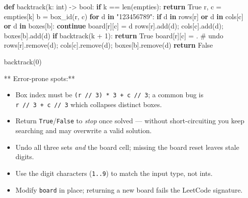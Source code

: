 \documentclass[11pt]{article}
\providecommand{\tightlist}{\setlength{\itemsep}{1pt}\setlength{\parskip}{0pt}}
\newenvironment{Shaded}{\begin{snugshade}}{\end{snugshade}}
\newcommand{\BuiltInTok}[1]{\textcolor[rgb]{0.50,0.55,0.55}{#1}}
\newcommand{\CommentTok}[1]{\textcolor[rgb]{0.48,0.49,0.49}{#1}}
\newcommand{\ControlFlowTok}[1]{\textcolor[rgb]{0.99,0.74,0.29}{\textbf{#1}}}
\newcommand{\DecValTok}[1]{\textcolor[rgb]{0.96,0.45,0.00}{#1}}
\newcommand{\KeywordTok}[1]{\textcolor[rgb]{0.81,0.81,0.76}{\textbf{#1}}}
\newcommand{\NormalTok}[1]{\textcolor[rgb]{0.81,0.81,0.76}{#1}}
\newcommand{\OperatorTok}[1]{\textcolor[rgb]{0.81,0.81,0.76}{#1}}
\newcommand{\StringTok}[1]{\textcolor[rgb]{0.96,0.31,0.31}{#1}}
\newcommand{\VariableTok}[1]{\textcolor[rgb]{0.15,0.68,0.68}{#1}}
\begin{document}
\begin{Shaded}
\begin{Highlighting}[]
    \KeywordTok{def}\NormalTok{ backtrack(k: }\BuiltInTok{int}\NormalTok{) }\OperatorTok{{-}\textgreater{}} \BuiltInTok{bool}\NormalTok{:}
        \ControlFlowTok{if}\NormalTok{ k }\OperatorTok{==} \BuiltInTok{len}\NormalTok{(empties):}
            \ControlFlowTok{return} \VariableTok{True}
\NormalTok{        r, c }\OperatorTok{=}\NormalTok{ empties[k]}
\NormalTok{        b }\OperatorTok{=}\NormalTok{ box\_id(r, c)}
        \ControlFlowTok{for}\NormalTok{ d }\KeywordTok{in} \StringTok{"123456789"}\NormalTok{:}
            \ControlFlowTok{if}\NormalTok{ d }\KeywordTok{in}\NormalTok{ rows[r] }\KeywordTok{or}\NormalTok{ d }\KeywordTok{in}\NormalTok{ cols[c] }\KeywordTok{or}\NormalTok{ d }\KeywordTok{in}\NormalTok{ boxes[b]:}
                \ControlFlowTok{continue}
\NormalTok{            board[r][c] }\OperatorTok{=}\NormalTok{ d}
\NormalTok{            rows[r].add(d)}\OperatorTok{;}\NormalTok{ cols[c].add(d)}\OperatorTok{;}\NormalTok{ boxes[b].add(d)}
            \ControlFlowTok{if}\NormalTok{ backtrack(k }\OperatorTok{+} \DecValTok{1}\NormalTok{):}
                \ControlFlowTok{return} \VariableTok{True}
\NormalTok{            board[r][c] }\OperatorTok{=} \StringTok{\textquotesingle{}.\textquotesingle{}}                       \CommentTok{\# undo}
\NormalTok{            rows[r].remove(d)}\OperatorTok{;}\NormalTok{ cols[c].remove(d)}\OperatorTok{;}\NormalTok{ boxes[b].remove(d)}
        \ControlFlowTok{return} \VariableTok{False}

\NormalTok{    backtrack(}\DecValTok{0}\NormalTok{)}
\end{Highlighting}
\end{Shaded}

** Error-prone spots:**

\begin{itemize}
\tightlist
\item
  Box index must be \texttt{(r\ //\ 3)\ *\ 3\ +\ c\ //\ 3}; a common bug is \texttt{r\ //\ 3\ +\ c\ //\ 3} which collapses distinct boxes.
\item
  Return \texttt{True}/\texttt{False} to \emph{stop} once solved --- without short-circuiting you keep searching and may overwrite a valid solution.
\item
  Undo all three sets \emph{and} the board cell; missing the board reset leaves stale digits.
\item
  Use the digit characters (\texttt{\textquotesingle{}1\textquotesingle{}..\textquotesingle{}9\textquotesingle{}}) to match the input type, not ints.
\item
  Modify \texttt{board} in place; returning a new board fails the LeetCode signature.
\end{itemize}
\end{document}
